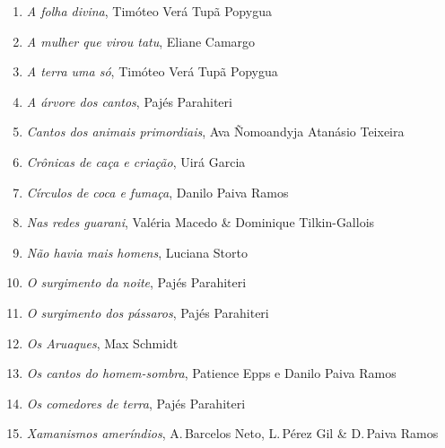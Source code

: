 \begin{enumerate}
\setlength\parskip{4.2pt}
\setlength\itemsep{-1.4mm}
\item \textit{A folha divina}, Timóteo Verá Tupã Popygua
\item \textit{A mulher que virou tatu}, Eliane Camargo
\item \textit{A terra uma só}, Timóteo Verá Tupã Popygua
\item \textit{A árvore dos cantos}, Pajés Parahiteri
\item \textit{Cantos dos animais primordiais}, Ava Ñomoandyja Atanásio Teixeira
\item \textit{Crônicas de caça e criação}, Uirá Garcia
\item \textit{Círculos de coca e fumaça}, Danilo Paiva Ramos
\item \textit{Nas redes guarani}, Valéria Macedo \& Dominique Tilkin-Gallois
\item \textit{Não havia mais homens}, Luciana Storto
\item \textit{O surgimento da noite}, Pajés Parahiteri
\item \textit{O surgimento dos pássaros}, Pajés Parahiteri
\item \textit{Os Aruaques}, Max Schmidt
\item \textit{Os cantos do homem-sombra}, Patience Epps e Danilo Paiva Ramos
\item \textit{Os comedores de terra}, Pajés Parahiteri
\item \textit{Xamanismos ameríndios}, A.\,Barcelos Neto, L.\,Pérez Gil \& D.\,Paiva Ramos
\end{enumerate}




